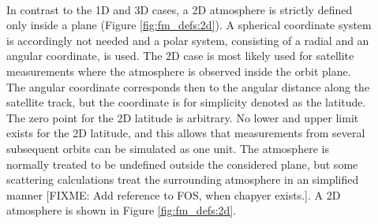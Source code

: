 \begin{description}
\item[\,\,\,] In contrast to the 1D and 3D cases, a 2D atmosphere
  is strictly defined only inside a plane (Figure \ref{fig:fm_defs:2d}). A
  spherical coordinate system is accordingly not needed and a polar
  system, consisting of a radial and an angular
  coordinate, is used. The 2D case is most likely used for satellite
  measurements where the atmosphere is observed inside the orbit plane. The
  angular coordinate corresponds then to the angular distance along the
  satellite track, but the coordinate is for simplicity denoted as the
  latitude. The zero point for the 2D latitude is arbitrary. No lower and upper
  limit exists for the 2D latitude, and this allows that measurements from
  several subsequent orbits can be simulated as one unit. The atmosphere is
  normally treated to be undefined outside the considered plane, but some
  scattering calculations treat the surrounding atmosphere in an simplified
  manner [FIXME: Add reference to FOS, when chapyer exists.]. A 2D atmosphere
  is shown in Figure \ref{fig:fm_defs:2d}.

\end{description}

